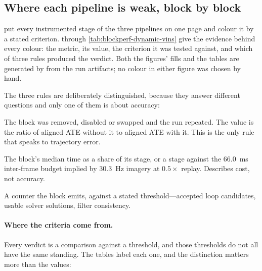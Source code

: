 \subsection{Where each pipeline is weak, block by block}
\label{sec:block-performance}

 put every instrumented stage of
the three pipelines on one page and colour it by a stated criterion.
 through \cref{tab:blockperf-dynamic-vins} give the evidence behind every
colour: the metric, its value, the criterion it was tested against, and which of
three rules produced the verdict. Both the figures' fills and the tables are
generated by  from the run artifacts; no colour
in either figure was chosen by hand.

The three rules are deliberately distinguished, because they answer different
questions and only one of them is about accuracy:

\begin{description}[leftmargin=2.2em,style=nextline]
  \item[ablation] The block was removed, disabled or swapped and the run repeated.
    The value is the ratio of aligned ATE without it to aligned ATE with it. This
    is the only rule that speaks to trajectory error.
  \item[latency] The block's median time as a share of its stage, or a stage
    against the \SI{66.0}{\milli\second} inter-frame budget implied by
    \SI{30.3}{\hertz} imagery at $0.5\times$ replay. Describes cost, not accuracy.
  \item[outcome] A counter the block emits, against a stated threshold---accepted
    loop candidates, usable solver solutions, filter consistency.
\end{description}

\paragraph{Where the criteria come from.}
Every verdict is a comparison against a threshold, and those thresholds do not all
have the same standing. The tables label each one, and the distinction matters
more than the values:

